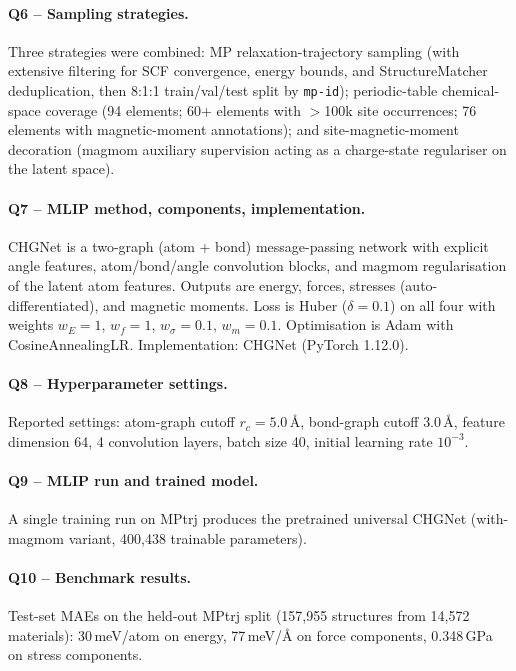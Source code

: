 \paragraph{Q6 -- Sampling strategies.}
Three strategies were combined: MP relaxation-trajectory sampling
(with extensive filtering for SCF convergence, energy bounds, and
StructureMatcher deduplication, then 8:1:1 train/val/test split by
\texttt{mp-id}); periodic-table chemical-space coverage (94 elements;
60+ elements with $>$100k site occurrences; 76 elements with
magnetic-moment annotations); and site-magnetic-moment decoration
(magmom auxiliary supervision acting as a charge-state regulariser
on the latent space).


\paragraph{Q7 -- MLIP method, components, implementation.}
CHGNet is a two-graph (atom + bond) message-passing network with
explicit angle features, atom/bond/angle convolution blocks, and
magmom regularisation of the latent atom features. Outputs are
energy, forces, stresses (auto-differentiated), and magnetic moments.
Loss is Huber ($\delta=0.1$) on all four with weights
$w_E=1$, $w_f=1$, $w_\sigma=0.1$, $w_m=0.1$. Optimisation is Adam with
CosineAnnealingLR. Implementation: CHGNet (PyTorch 1.12.0).


\paragraph{Q8 -- Hyperparameter settings.}
Reported settings: atom-graph cutoff $r_c = 5.0$\,\AA, bond-graph
cutoff $3.0$\,\AA, feature dimension 64, 4 convolution layers, batch
size 40, initial learning rate $10^{-3}$.


\paragraph{Q9 -- MLIP run and trained model.}
A single training run on MPtrj produces the pretrained universal
CHGNet (with-magmom variant, 400{,}438 trainable parameters).


\paragraph{Q10 -- Benchmark results.}
Test-set MAEs on the held-out MPtrj split (157{,}955 structures from
14{,}572 materials): 30\,meV/atom on energy, 77\,meV/\AA{} on force
components, 0.348\,GPa on stress components.


